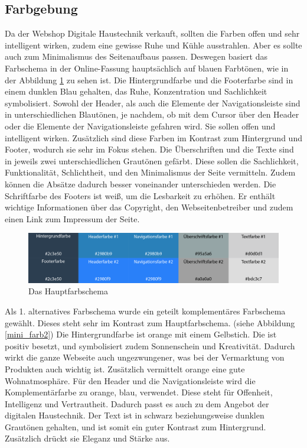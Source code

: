 	\subsection{Farbgebung}
	\label{farb_mini}

Da der Webshop Digitale Haustechnik verkauft, sollten die Farben offen und sehr intelligent wirken, zudem eine gewisse Ruhe und Kühle ausstrahlen. Aber es sollte auch zum Minimalismus des Seitenaufbaus passen.
Deswegen basiert das Farbschema in der Online-Fassung hauptsächlich auf blauen Farbtönen, wie in der Abbildung \ref{mini_farb1} zu sehen ist. Die Hintergrundfarbe und die Footerfarbe sind in einem dunklen Blau gehalten, das Ruhe, Konzentration und Sachlichkeit symbolisiert. 
Sowohl der Header, als auch die Elemente der Navigationsleiste sind in unterschiedlichen Blautönen, je nachdem, ob mit dem Cursor über den Header oder die Elemente der Navigationsleiste gefahren wird. Sie sollen offen und intelligent wirken. Zusätzlich sind diese Farben im Kontrast zum Hintergrund und Footer, wodurch sie sehr im Fokus stehen.
Die Überschriften und die Texte sind in jeweils zwei unterschiedlichen Grautönen gefärbt. Diese sollen die Sachlichkeit, Funktionalität, Schlichtheit, und den Minimalismus der Seite vermitteln. Zudem können die Absätze dadurch besser voneinander unterschieden werden.
Die Schriftfarbe des Footers ist weiß, um die Lesbarkeit zu erhöhen. Er enthält wichtige Informationen über das Copyright, den Webseitenbetreiber und zudem einen Link zum Impressum der Seite. 
	\begin{figure} [hp]
	\includegraphics[width=\textwidth]{./img/mini_farb1.png}
	\caption{Das Hauptfarbschema}
	\label{mini_farb1}
\end{figure}

Als 1. alternatives Farbschema wurde ein geteilt komplementäres Farbschema gewählt. Dieses steht sehr im Kontrast zum Hauptfarbschema. (siehe Abbildung \ref{mini_farb2}) 
Die Hintergrundfarbe ist orange mit einem Gelbstich. Die ist positiv besetzt, und symbolisiert zudem Sonnenschein und Kreativität. Dadurch wirkt die ganze Webseite auch ungezwungener, was bei der Vermarktung von Produkten auch wichtig ist. Zusätzlich vermittelt orange eine gute Wohnatmosphäre.
Für den Header und die Navigationsleiste wird die Komplementärfarbe zu orange, blau, verwendet. Diese steht für Offenheit, Intelligenz und Vertrautheit. Dadurch passt es auch zu dem Angebot der digitalen Haustechnik. 
Der Text ist in schwarz beziehungsweise dunklen Grautönen gehalten, und ist somit ein guter Kontrast zum Hintergrund. Zusätzlich drückt sie Eleganz und Stärke aus.

